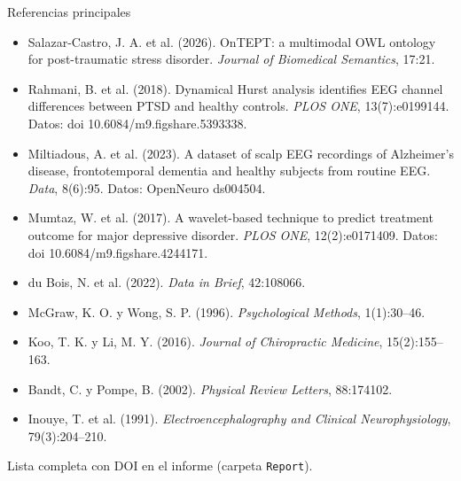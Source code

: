 \documentclass[aspectratio=169,11pt]{beamer}
\begin{document}
\begin{frame}{Referencias principales}
  \scriptsize
  \begin{itemize}
    \item Salazar-Castro, J. A. et al. (2026). OnTEPT: a multimodal OWL ontology for post-traumatic stress disorder. \emph{Journal of Biomedical Semantics}, 17:21.
    \item Rahmani, B. et al. (2018). Dynamical Hurst analysis identifies EEG channel differences between PTSD and healthy controls. \emph{PLOS ONE}, 13(7):e0199144. Datos: doi 10.6084/m9.figshare.5393338.
    \item Miltiadous, A. et al. (2023). A dataset of scalp EEG recordings of Alzheimer's disease, frontotemporal dementia and healthy subjects from routine EEG. \emph{Data}, 8(6):95. Datos: OpenNeuro ds004504.
    \item Mumtaz, W. et al. (2017). A wavelet-based technique to predict treatment outcome for major depressive disorder. \emph{PLOS ONE}, 12(2):e0171409. Datos: doi 10.6084/m9.figshare.4244171.
    \item du Bois, N. et al. (2022). \emph{Data in Brief}, 42:108066.
    \item McGraw, K. O. y Wong, S. P. (1996). \emph{Psychological Methods}, 1(1):30--46.
    \item Koo, T. K. y Li, M. Y. (2016). \emph{Journal of Chiropractic Medicine}, 15(2):155--163.
    \item Bandt, C. y Pompe, B. (2002). \emph{Physical Review Letters}, 88:174102.
    \item Inouye, T. et al. (1991). \emph{Electroencephalography and Clinical Neurophysiology}, 79(3):204--210.
  \end{itemize}
  \vspace{1mm}
  {\footnotesize Lista completa con DOI en el informe (carpeta \texttt{Report}).}
\end{frame}
\end{document}
